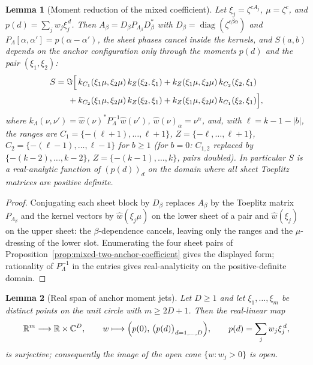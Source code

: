 \documentclass[11pt]{article}
\newtheorem{lemma}{Lemma}
\begin{document}
\begin{lemma}[Moment reduction of the mixed coefficient]
\label{lem:mixed-coefficient-moment-reduction}
Let $\xi_j=\zeta^{cA_j}$, $\mu=\zeta^{c}$, and $p(d)=\sum_j w_j\xi_j^{\,d}$.
Then $A_\beta=D_\beta P_{\Lambda_\beta}D_\beta^\ast$ with $D_\beta=
\operatorname{diag}(\zeta^{c\beta\alpha})$ and $P_\Lambda[\alpha,\alpha']=p(\alpha-\alpha')$, the
sheet phases cancel inside the kernels, and $S(a,b)$ depends on the anchor configuration only
through the moments $p(d)$ and the pair $(\xi_1,\xi_2)$:
\begin{align*}
S
=
\Im\Bigl[\,
&k_{C_1}(\xi_1\mu,\xi_2\mu)\,k_{Z}(\xi_2,\xi_1)
+k_{Z}(\xi_1\mu,\xi_2\mu)\,k_{C_2}(\xi_2,\xi_1)\\
{}+{}&k_{C_2}(\xi_1\mu,\xi_2\mu)\,k_{Z}(\xi_2,\xi_1)
+k_{Z}(\xi_1\mu,\xi_2\mu)\,k_{C_1}(\xi_2,\xi_1)
\Bigr],
\end{align*}
where $k_\Lambda(\nu,\nu')=\widehat w(\nu)^\ast P_\Lambda^{-1}\widehat w(\nu')$,
$\widehat w(\nu)_\alpha=\nu^{\alpha}$, and, with $\ell=k-1-|b|$, the ranges are
$C_1=\{-(\ell+1),\dots,\ell+1\}$, $Z=\{-\ell,\dots,\ell+1\}$,
$C_2=\{-(\ell-1),\dots,\ell-1\}$ for $b\ge1$
(for $b=0$: $C_{1,2}$ replaced by $\{-(k-2),\dots,k-2\}$, $Z=\{-(k-1),\dots,k\}$, pairs doubled).
In particular $S$ is a real-analytic function of $(p(d))_d$ on the domain where all sheet Toeplitz
matrices are positive definite.
\end{lemma}

\begin{proof}
Conjugating each sheet block by $D_\beta$ replaces $A_\beta$ by the Toeplitz matrix
$P_{\Lambda_\beta}$ and the kernel vectors by $\widehat w(\xi_j\mu)$ on the lower sheet of a pair
and $\widehat w(\xi_j)$ on the upper sheet: the $\beta$-dependence cancels, leaving only the ranges
and the $\mu$-dressing of the lower slot.
Enumerating the four sheet pairs of Proposition~\ref{prop:mixed-two-anchor-coefficient} gives the
displayed form; rationality of $P_\Lambda^{-1}$ in the entries gives real-analyticity on the
positive-definite domain.
\end{proof}

\begin{lemma}[Real span of anchor moment jets]
\label{lem:anchor-moment-real-span}
Let $D\ge1$ and let $\xi_1,\dots,\xi_m$ be distinct points on the unit circle with $m\ge2D+1$.
Then the real-linear map
\[
\mathbb{R}^m\longrightarrow\mathbb{R}\times\mathbb{C}^{D},
\qquad
w\longmapsto\Bigl(p(0),\,\bigl(p(d)\bigr)_{d=1,\dots,D}\Bigr),
\qquad
p(d)=\sum_j w_j\xi_j^{\,d},
\]
is surjective; consequently the image of the open cone $\{w:w_j>0\}$ is open.
\end{lemma}
\end{document}
